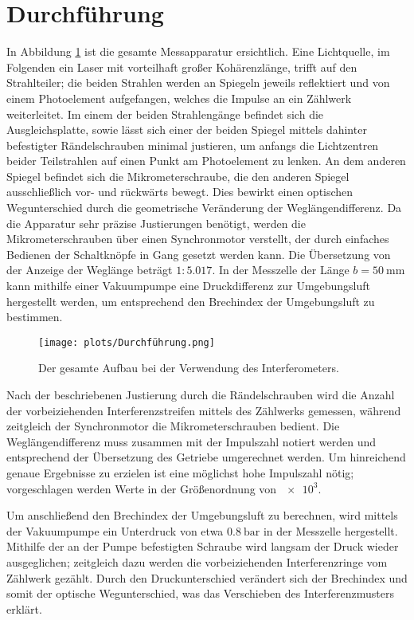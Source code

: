 \section{Durchführung}
\label{sec:Durchführung}

In Abbildung \ref{fig:Aufbau_Durchfuehrung} ist die gesamte Messapparatur ersichtlich. 
Eine Lichtquelle, im Folgenden ein Laser mit vorteilhaft großer Kohärenzlänge, trifft auf den Strahlteiler; die beiden Strahlen werden an Spiegeln jeweils 
reflektiert und von einem Photoelement aufgefangen, welches die Impulse an ein Zählwerk weiterleitet. 
Im einem der beiden Strahlengänge befindet sich die Ausgleichsplatte, sowie lässt sich einer der beiden Spiegel mittels 
dahinter befestigter Rändelschrauben minimal justieren, um anfangs die Lichtzentren beider Teilstrahlen auf einen Punkt am Photoelement 
zu lenken. 
An dem anderen Spiegel befindet sich die Mikrometerschraube, die den anderen Spiegel ausschließlich vor- und rückwärts bewegt. 
Dies bewirkt einen optischen Wegunterschied durch die geometrische Veränderung der Weglängendifferenz. 
Da die Apparatur sehr präzise Justierungen benötigt, werden die Mikrometerschrauben über einen Synchronmotor verstellt, der durch einfaches Bedienen 
der Schaltknöpfe in Gang gesetzt werden kann. 
Die Übersetzung von der Anzeige der Weglänge beträgt $1:5.017$.
In der Messzelle der Länge $b=\SI{50}{\milli\meter}$ kann mithilfe einer Vakuumpumpe eine Druckdifferenz zur Umgebungsluft hergestellt werden, 
um entsprechend den Brechindex der Umgebungsluft zu bestimmen.

\begin{figure}
    \centering
    \texttt{[image: plots/Durchführung.png]}
    \caption{Der gesamte Aufbau bei der Verwendung des Interferometers\cite{Versuchsanleitung}.}
    \label{fig:Aufbau_Durchfuehrung}
\end{figure}

Nach der beschriebenen Justierung durch die Rändelschrauben wird die Anzahl der vorbeiziehenden Interferenzstreifen mittels des Zählwerks 
gemessen, während zeitgleich der Synchronmotor die Mikrometerschrauben bedient. 
Die Weglängendifferenz muss zusammen mit der Impulszahl notiert werden und entsprechend der Übersetzung des Getriebe umgerechnet werden. 
Um hinreichend genaue Ergebnisse zu erzielen ist eine möglichst hohe Impulszahl nötig; vorgeschlagen werden 
Werte in der Größenordnung von $\num{e3}$. 

Um anschließend den Brechindex der Umgebungsluft zu berechnen, wird mittels der Vakuumpumpe ein Unterdruck von etwa $\SI{0.8}{\bar}$ 
in der Messzelle hergestellt. 
Mithilfe der an der Pumpe befestigten Schraube wird langsam der Druck wieder ausgeglichen; zeitgleich dazu werden die vorbeiziehenden 
Interferenzringe vom Zählwerk gezählt. 
Durch den Druckunterschied verändert sich der Brechindex und somit der optische Wegunterschied, was das Verschieben des Interferenzmusters erklärt. 

